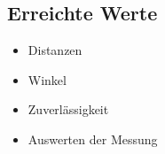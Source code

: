 \subsection{Erreichte Werte}
\begin{itemize}
\item Distanzen
\item Winkel
\item Zuverlässigkeit
\item Auswerten der Messung
\end{itemize}